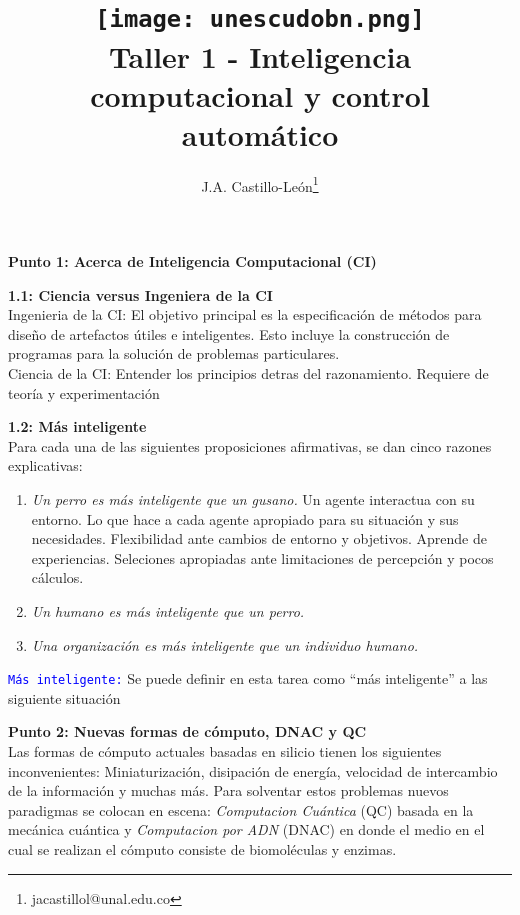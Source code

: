 \documentclass[10pt,onecolumn,twoside,letterpaper]{article}
\title{\vspace{-0.8cm}\texttt{[image: unescudobn.png]}\\\vspace{-0.0cm}
  \LARGE \textbf{Taller 1 - Inteligencia computacional y control autom\'atico}}
\author{J.A. Castillo-Le\'on\thanks{jacastillol@unal.edu.co}}
\date{}
\begin{document}
\maketitle
\begin{abstract}\small

\end{abstract}
\par{\bf \large Punto 1: Acerca de Inteligencia Computacional (CI)}\\
\par{\bf 1.1: Ciencia versus Ingeniera de la CI}\\
Ingenieria de la CI: El objetivo principal es la especificaci\'on de m\'etodos para dise\~no de artefactos \'utiles e inteligentes. Esto incluye la construcci\'on de programas para la soluci\'on de problemas particulares.\\
Ciencia de la CI: Entender los principios detras del razonamiento. Requiere de teor\'ia y experimentaci\'on 
\par{\bf 1.2: M\'as inteligente}\\
Para cada una de las siguientes proposiciones afirmativas, se dan cinco razones explicativas:
\begin{enumerate}
\item \emph{Un perro es m\'as inteligente que un gusano.} Un agente interactua con su entorno. Lo que hace a cada agente apropiado para su situaci\'on y sus necesidades. Flexibilidad ante cambios de entorno y objetivos. Aprende de experiencias. Seleciones apropiadas ante limitaciones de percepci\'on y pocos c\'alculos.
\item \emph{Un humano es m\'as inteligente que un perro.}
\item \emph{Una organizaci\'on es m\'as inteligente que un individuo humano.}
\end{enumerate}
\par \textcolor{blue}{\texttt{M\'as inteligente:}} Se puede definir en esta tarea como ``m\'as inteligente'' a las siguiente situaci\'on \cite{Verdaasdonk2009}\\
\par{\bf \large Punto 2: Nuevas formas de c\'omputo, DNAC y QC}\\
Las formas de c\'omputo actuales basadas en silicio tienen los siguientes inconvenientes: Miniaturizaci\'on, disipaci\'on de energ\'ia, velocidad de intercambio de la informaci\'on y muchas m\'as. Para solventar estos problemas nuevos paradigmas se colocan en escena: \emph{Computacion Cu\'antica} (QC) basada en la mec\'anica cu\'antica y \emph{Computacion por ADN} (DNAC) en donde el medio en el cual se realizan el c\'omputo consiste de biomol\'eculas y enzimas. 
\end{document}
